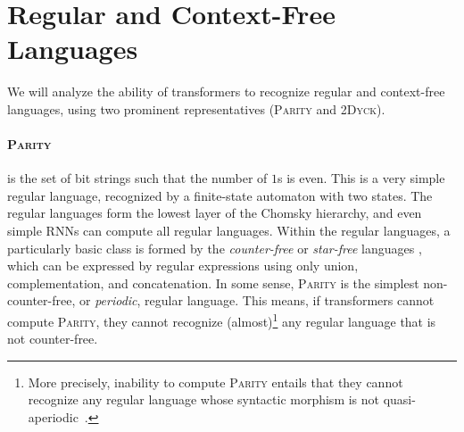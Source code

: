 \documentclass[11pt,a4paper]{article}
\begin{document}






\section{Regular and Context-Free Languages}\label{sec:langs} %

We will analyze the ability of transformers to recognize regular and context-free languages, using two prominent representatives (\textsc{Parity} and \textsc{2Dyck}). %


\paragraph{\textsc{Parity}} is the set of bit strings such that the number of $1$s is even.
This is a very simple regular language, recognized by a finite-state automaton with two states.
The regular languages form the lowest layer of the Chomsky hierarchy, and even simple RNNs can compute all regular languages.
Within the regular languages, a particularly basic class is formed by the \emph{counter-free} or \emph{star-free} languages \cite{mcnaughton1971counter}, which can be expressed by regular expressions using only union, complementation, and concatenation.
In some sense, \textsc{Parity} is the simplest non-counter-free, or \emph{periodic}, regular language.
This means, if transformers cannot compute \textsc{Parity}, they cannot recognize (almost)\footnote{More precisely, inability to compute \textsc{Parity} entails that they cannot recognize any regular language whose syntactic morphism is not quasi-aperiodic~\cite[p. 488]{barrington1992regular}.} any regular language that is not counter-free.
\end{document}
